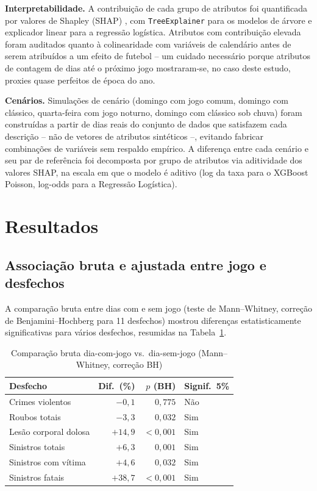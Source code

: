 \documentclass[12pt]{article}
\begin{document}
\textbf{Interpretabilidade.} A contribuição de cada grupo de atributos
foi quantificada por valores de Shapley (SHAP) \cite{lundberg2017}, com
\texttt{TreeExplainer} para os modelos de árvore e explicador linear para
a regressão logística. Atributos com contribuição elevada foram
auditados quanto à colinearidade com variáveis de calendário antes de
serem atribuídos a um efeito de futebol -- um cuidado necessário porque
atributos de contagem de dias até o próximo jogo mostraram-se, no caso
deste estudo, proxies quase perfeitos de época do ano.

\textbf{Cenários.} Simulações de cenário (domingo com jogo comum, domingo
com clássico, quarta-feira com jogo noturno, domingo com clássico sob
chuva) foram construídas a partir de dias reais do conjunto de dados que
satisfazem cada descrição -- não de vetores de atributos sintéticos --,
evitando fabricar combinações de variáveis sem respaldo empírico. A
diferença entre cada cenário e seu par de referência foi decomposta por
grupo de atributos via aditividade dos valores SHAP, na escala em que o
modelo é aditivo (log da taxa para o XGBoost Poisson, log-odds para a
Regressão Logística).

\section{Resultados}

\subsection{Associação bruta e ajustada entre jogo e desfechos}

A comparação bruta entre dias com e sem jogo (teste de Mann--Whitney,
correção de Benjamini--Hochberg para 11 desfechos) mostrou diferenças
estatisticamente significativas para vários desfechos, resumidas na
Tabela~\ref{tab:bruto}.

\begin{table}[ht]
\centering
\caption{Comparação bruta dia-com-jogo vs.\ dia-sem-jogo (Mann--Whitney,
correção BH)}
\label{tab:bruto}
\small
\begin{tabular}{@{}lrrl@{}}
\toprule
\textbf{Desfecho} & \textbf{Dif.\ (\%)} & \textbf{$p$ (BH)} & \textbf{Signif.\ 5\%} \\
\midrule
Crimes violentos          & $-0,1$  & $0,775$  & Não \\
Roubos totais             & $-3,3$  & $0,032$  & Sim \\
Lesão corporal dolosa     & $+14,9$ & $<0,001$ & Sim \\
Sinistros totais          & $+6,3$  & $0,001$  & Sim \\
Sinistros com vítima      & $+4,6$  & $0,032$  & Sim \\
Sinistros fatais          & $+38,7$ & $<0,001$ & Sim \\
\bottomrule
\end{tabular}
\end{table}
\end{document}
